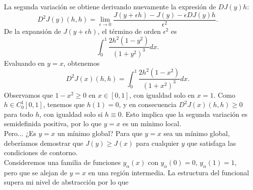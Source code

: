 \documentclass{elsarticle}
\begin{document}
La segunda variación se obtiene derivando nuevamente la expresión de \( DJ(y)h \):  
\[
D^2J(y)(h,h) = \lim_{\epsilon \to 0} \frac{J(y + \epsilon h) - J(y) - \epsilon DJ(y)h}{\epsilon^2}.
\]  
De la expansión de \( J(y + \epsilon h) \), el término de orden \( \epsilon^2 \) es  
\[
\int_0^1 \frac{2h^2(1 - y^2)}{(1 + y^2)^3} dx.
\]  
Evaluando en \( y = x \), obtenemos  
\[
D^2J(x)(h,h) = \int_0^1 \frac{2h^2(1 - x^2)}{(1 + x^2)^3} dx.
\]  
Observamos que \( 1 - x^2 \geq 0 \) en \( x \in [0,1] \), con igualdad solo en \( x = 1 \). Como \( h \in C_0^1[0,1] \), tenemos que \( h(1) = 0 \), y en consecuencia \( D^2J(x)(h,h) \geq 0 \) para todo \( h \), con igualdad solo si \( h \equiv 0 \). Esto implica que la segunda variación es semidefinida positiva, por lo que \( y = x \) es un mínimo local.  \\

Pero... ¿Es \( y = x \) un mínimo global? Para que \( y = x \) sea un mínimo global, deberíamos demostrar que \( J(y) \geq J(x) \) para cualquier \( y \) que satisfaga las condiciones de contorno. \\  

Consideremos una familia de funciones \( y_\alpha(x) \) con \( y_\alpha(0) = 0 \), \( y_\alpha(1) = 1 \), pero que se alejan de \( y = x \) en una región intermedia. La estructura del funcional supera mi nivel de abstracción por lo que 
\end{document}
